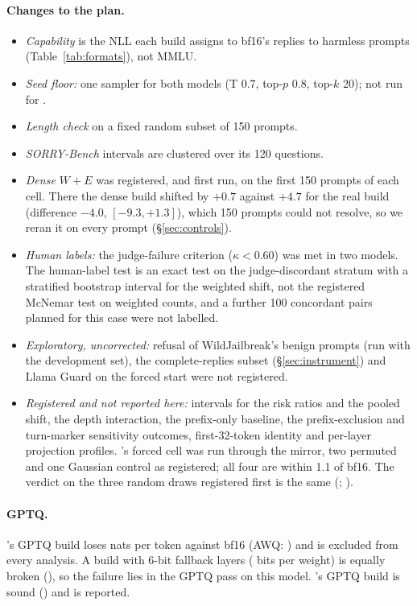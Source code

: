 \paragraph{Changes to the plan.}
\begin{itemize}[leftmargin=*,itemsep=1pt,topsep=2pt]
\item \emph{Capability} is the NLL each build assigns to bf16's replies to harmless prompts (Table~\ref{tab:formats}), not MMLU.
\item \emph{Seed floor:} one sampler for both models (T 0.7, top-$p$ 0.8, top-$k$ 20); not run for \qwenthree.
\item \emph{Length check} on a fixed random subset of 150 prompts.
\item \emph{SORRY-Bench} intervals are clustered over its 120 questions.
\item \emph{Dense $W+E$} was registered, and first run, on the first 150 prompts of each cell. There the \qwen{} dense build shifted by $+0.7$\pp{} against $+4.7$ for the real build (difference $-4.0$, $[-9.3, +1.3]$), which 150 prompts could not resolve, so we reran it on every prompt (\S\ref{sec:controls}).
\item \emph{Human labels:} the judge-failure criterion ($\kappa<0.60$) was met in two models. The human-label test is an exact test on the judge-discordant stratum with a stratified bootstrap interval for the weighted shift, not the registered McNemar test on weighted counts, and a further 100 concordant pairs planned for this case were not labelled.
\item \emph{Exploratory, uncorrected:} refusal of WildJailbreak's benign prompts (run with the development set), the complete-replies subset (\S\ref{sec:instrument}) and Llama Guard on the forced start were not registered.
\item \emph{Registered and not reported here:} intervals for the risk ratios and the pooled shift, the depth interaction, the prefix-only baseline, the prefix-exclusion and turn-marker sensitivity outcomes, first-32-token identity and per-layer projection profiles. \qwenthree's forced cell was run through the mirror, two permuted and one Gaussian control as registered; all four are within 1.1\pp{} of bf16. The verdict on the three random draws registered first is the same (; ).
\end{itemize}

\paragraph{GPTQ.} \qwen's GPTQ build loses  nats per token against bf16 (AWQ: ) and is excluded from every analysis. A build with 6-bit fallback layers ( bits per weight) is equally broken (), so the failure lies in the GPTQ pass on this model. \llama's GPTQ build is sound () and is reported.

